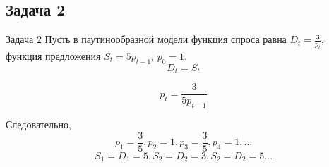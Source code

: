 \documentclass[xcolor=table]{beamer}
\begin{document}
\subsection{Задача 2}
\begin{frame}{Задача 2}
\hspace{0.7cm} Пусть в паутинообразной модели функция спроса равна $D_{t} = \frac{3}{p_{t}}$, функция предложения $S_{t}=5p_{t-1}$, $p_{0}=1$.
$$ D_{t} = S_{t} $$

$$p_{t} =  \frac{3}{5p_{t-1}}$$

\hspace{0.7cm} Следовательно, $$p_{1}=\frac{3}{5},p_{2}=1,p_{3}=\frac{3}{5},p_{4} = 1, \dots$$
$$S_{1}=D_{1}=5, S_{2}=D_{2} = 3, S_{2}=D_{2} = 5 \dots$$

\end{frame}

\end{document}
